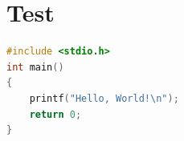 \section{Test}

    

\begin{lstlisting}[language=c, caption=Example C Code]
#include <stdio.h>
int main() 
{
    printf("Hello, World!\n");
    return 0;
}
\end{lstlisting}